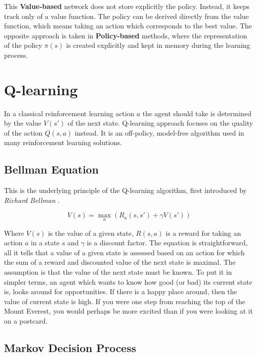 This \textbf{Value-based} network does not store explicitly the policy. Instead, it keeps track only of a value function. The policy can be derived directly from the value function, which means taking an action which corresponds to the best value.
The opposite approach is taken in \textbf{Policy-based} methods, where the representation of the policy $\pi(s)$ is created explicitly and kept in memory during the learning process. 

\section{Q-learning}
\label{sec:q-learn}

In a classical reinforcement learning action $a$ the agent should take is determined by the value $V(s')$ of the next state. Q-learning approach focuses on the quality of the action $Q(s, a)$ instead. It is an off-policy, model-free algorithm used in many reinforcement learning solutions.

\subsection{Bellman Equation}
\label{sub:bellman-eq}

This is the underlying principle of the Q-learning algorithm, first introduced by \emph{Richard Bellman} \cite{Bellman:DynamicProgramming}.

\begin{equation}
    V(s) = \max_a\left(R_a(s, s') + \gamma V(s') \right)
\label{eq:bellman}
\end{equation}

Where $V(s)$ is the value of a given state, $R(s, a)$ is a reward for taking an action $a$ in a state $s$ and $\gamma$ is a discount factor. The equation is straightforward, all it tells that a value of a given state is assessed based on an action for which the sum of a reward and discounted value of the next state is maximal. The assumption is that the value of the next state must be known. To put it in simpler terms, an agent which wants to know how good (or bad) its current state is, looks around for opportunities. If there is a happy place around, then the value of current state is high. If you were one step from reaching the top of the Mount Everest, you would perhaps be more excited than if you were looking at it on a postcard.

\subsection{Markov Decision Process}
\label{sub:mdp}

